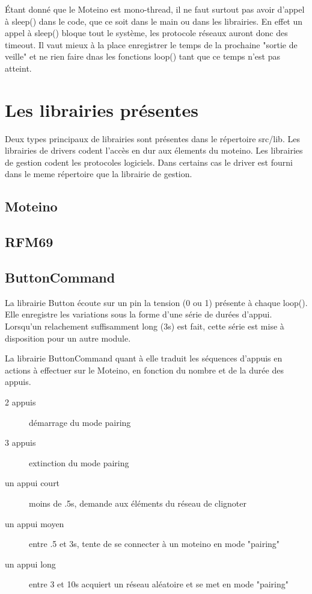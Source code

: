 \documentclass{report}
\begin{document}
Étant donné que le Moteino est mono-thread, il ne faut surtout pas avoir d'appel à sleep() dans le code, que ce soit dans le main ou dans les librairies. En effet un appel à sleep() bloque tout le système, les protocole réseaux auront donc des timeout. Il vaut mieux à la place enregistrer le temps de la prochaine "sortie de veille" et ne rien faire dnas les fonctions loop() tant que ce temps n'est pas atteint.

\section{Les librairies présentes}

Deux types principaux de librairies sont présentes dans le répertoire src/lib. Les librairies de drivers codent l'accès en dur aux élements du moteino. Les librairies de gestion codent les protocoles logiciels. Dans certains cas le driver est fourni dans le meme répertoire que la librairie de gestion.

\subsection{Moteino}

\subsection{RFM69}

\subsection{ButtonCommand}

La librairie Button écoute sur un pin la tension (0 ou 1) présente à chaque loop(). Elle enregistre les variations sous la forme d'une série de durées d'appui. Lorsqu'un relachement suffisamment long (3s) est fait, cette série est mise à disposition pour un autre module.

La librairie ButtonCommand quant à elle traduit les séquences d'appuis en actions à effectuer sur le Moteino, en fonction du nombre et de la durée des appuis.
\begin{description}
\item[2 appuis] démarrage du mode pairing
\item[3 appuis] extinction du mode pairing
\item[un appui court] moins de .5s, demande aux éléments du réseau de clignoter
\item[un appui moyen] entre .5 et 3s, tente de se connecter à un moteino en mode "pairing"
\item[un appui long] entre 3 et 10s acquiert un réseau aléatoire et se met en mode "pairing"
\end{description}
\end{document}
